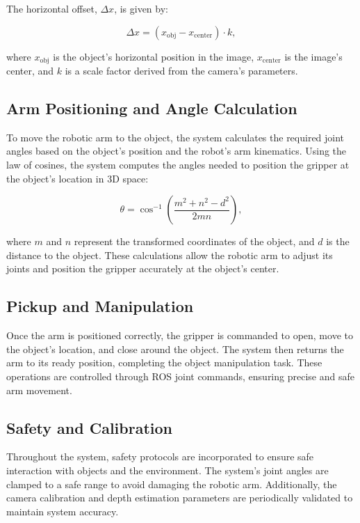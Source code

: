 The horizontal offset, $\Delta x$, is given by:

\begin{equation}
\Delta x = (x_{\text{obj}} - x_{\text{center}}) \cdot k,
\end{equation}

where $x_{\text{obj}}$ is the object’s horizontal position in the image, $x_{\text{center}}$ is the image’s center, and $k$ is a scale factor derived from the camera’s parameters.

\subsection{Arm Positioning and Angle Calculation}
To move the robotic arm to the object, the system calculates the required joint angles based on the object’s position and the robot’s arm kinematics. Using the law of cosines, the system computes the angles needed to position the gripper at the object’s location in 3D space:

\begin{equation}
\theta = \cos^{-1}\left( \frac{m^2 + n^2 - d^2}{2mn} \right),
\end{equation}

where $m$ and $n$ represent the transformed coordinates of the object, and $d$ is the distance to the object. These calculations allow the robotic arm to adjust its joints and position the gripper accurately at the object's center.

\subsection{Pickup and Manipulation}
Once the arm is positioned correctly, the gripper is commanded to open, move to the object’s location, and close around the object. The system then returns the arm to its ready position, completing the object manipulation task. These operations are controlled through ROS joint commands, ensuring precise and safe arm movement.

\subsection{Safety and Calibration}
Throughout the system, safety protocols are incorporated to ensure safe interaction with objects and the environment. The system’s joint angles are clamped to a safe range to avoid damaging the robotic arm. Additionally, the camera calibration and depth estimation parameters are periodically validated to maintain system accuracy.